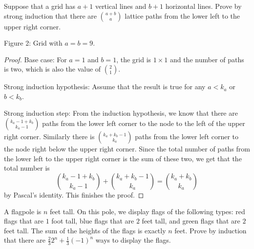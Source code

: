 \documentclass[11pt]{preprint}
\begin{document}
\item Suppose that a grid has $a+1$ vertical lines and $b+1$ horizontal lines. Prove by strong  induction that there are $\binom{a+b}{a}$ lattice paths from the lower left to the upper right corner.


\begin{center}

Figure 2: Grid with $a=b=9$.
\end{center}

\begin{proof}
Base case: For $a=1$ and $b=1$, the grid is $1\times 1$ and the number of paths is two, which is also the value of $\binom{2}{1}$.

Strong induction hypothesis: Assume that the result is true for any $a<k_a$ or $b<k_b$.

Strong induction step: From the induction hypothesis, we know that there are $\binom{k_a-1+k_b}{k_a-1}$ paths from the lower left corner to the node to the left of the upper right corner. Similarly there is $\binom{k_a+k_b-1}{k_a}$ paths from the lower left corner to the node right below the upper right corner. Since the total number of paths from the lower left to the upper right corner is the sum of these two, we get that the total number is
\[
\binom{k_a-1+k_b}{k_a-1}+\binom{k_a+k_b-1}{k_a}=\binom{k_a+k_b}{k_a}
\]
by Pascal's identity. This finishes the proof.
\end{proof}


\item A flagpole is $n$ feet tall. On this pole, we display flags of the following types: red flags that are $1$ foot tall, blue flags that are $2$ feet tall, and green flags that are $2$ feet tall. The sum of the heights of the flags is exactly $n$ feet. Prove by induction that there are $\frac{2}{3}2^n+\frac{1}{3}(-1)^n$ ways to display the flags.
\end{document}
